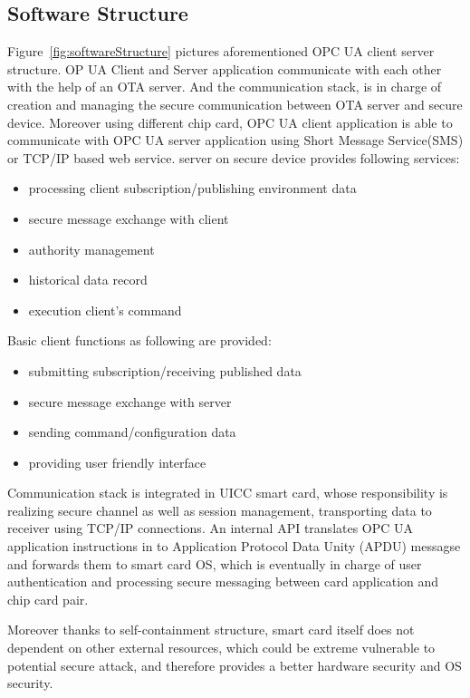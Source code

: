 \documentclass[]{llncs}
\begin{document}
\subsection {Software Structure}
Figure~\ref{fig:softwareStructure} pictures aforementioned OPC UA client server structure. OP UA Client and Server application communicate with each other with the help of an OTA server. And the communication stack,  is in charge of creation and managing the secure communication between OTA server and secure device. Moreover using different chip card, OPC UA client application is able to communicate with OPC UA server application using Short Message Service(SMS) or TCP/IP based web service. 
\newline
server on secure device provides following services:
 \begin{itemize}
  \item processing client subscription/publishing environment data
  \item secure message exchange with client
  \item authority management
  \item historical data record
  \item execution client's command
\end{itemize}
Basic client functions as following are provided:
 \begin{itemize}
  \item submitting subscription/receiving published data
  \item secure message exchange with server
  \item sending command/configuration data
  \item providing user friendly interface
\end{itemize}

Communication stack is integrated in UICC smart card, whose responsibility is realizing secure channel as well as session management, transporting data to receiver using TCP/IP connections. An internal API translates OPC UA application instructions in to Application Protocol Data Unity (APDU) messagse and forwards them to smart card OS, which is eventually in charge of user authentication and processing secure messaging between card application and chip card pair. 

Moreover thanks to self-containment structure, smart card itself does not dependent on other external resources, which could be extreme vulnerable to potential secure attack, and therefore provides a better hardware security and OS security.
\end{document}
